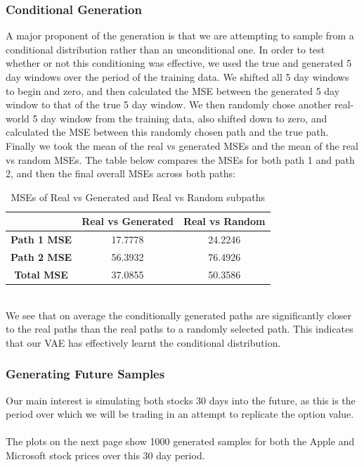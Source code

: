 \documentclass{article}
\theoremstyle{definition}
\begin{document}
\subsubsection{Conditional Generation}
A major proponent of the generation is that we are attempting to sample from a conditional distribution rather than an unconditional one. In order to test whether or not this conditioning was effective, we used the true and generated 5 day windows over the period of the training data. We shifted all 5 day windows to begin and zero, and then calculated the MSE between the generated 5 day window to that of the true 5 day window. We then randomly chose another real-world 5 day window from the training data, also shifted down to zero, and calculated the MSE between this randomly chosen path and the true path. Finally we took the mean of the real vs generated MSEs and the mean of the real vs random MSEs. The table below compares the MSEs for both path 1 and path 2, and then the final overall MSEs across both paths:
\begin{table}[h!]
    \centering
    \begin{tabular}{|c|c|c|}
        \hline
        & \textbf{Real vs Generated} & \textbf{Real vs Random} \\ 
        \hline
        \textbf{Path 1 MSE} & 17.7778 & 24.2246 \\ 
        \hline
        \textbf{Path 2 MSE} & 56.3932 & 76.4926 \\
        \hline
        \textbf{Total MSE} & 37.0855 & 50.3586\\
        \hline
    \end{tabular}
    \caption{MSEs of Real vs Generated and Real vs Random subpaths}
\end{table}\\
\noindent
We see that on average the conditionally generated paths are significantly closer to the real paths than the real paths to a randomly selected path. This indicates that our VAE has effectively learnt the conditional distribution.

\subsubsection{Generating Future Samples}
Our main interest is simulating both stocks 30 days into the future, as this is the period over which we will be trading in an attempt to replicate the option value.
\\\\
The plots on the next page show 1000 generated samples for both the Apple and Microsoft stock prices over this 30 day period.
\end{document}
